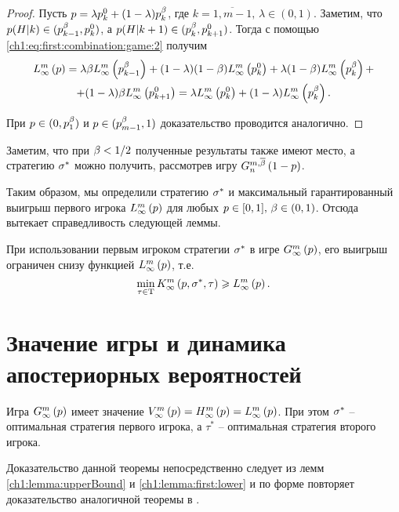 {\begin{proof}
  Пусть $p = \lambda\pEven + (1-\lambda)\pOdd$, где $k = \overline{1, m - 1}, \, \lambda \in (0, 1)$.
  Заметим, что $p(H|k) \in ( \pOdd[k-1], \pEven )$, а $p(H|k+1) \in ( \pOdd, \pEven[k+1] )$.
  Тогда с помощью \eqref{ch1:eq:first:combination:game:2} получим
  \begin{multline*}
    \lowerBound{p} =
    \lambda \Co \lowerBound{\pOdd[k-1]} + 
    (1-\lambda)(1-\Co)\lowerBound{\pEven} + \lambda(1-\Co)\lowerBound{\pOdd} + \\
    + (1-\lambda)\Co\lowerBound{\pEven[k+1]} 
    = \lambda \lowerBound{\pEven} + (1-\lambda) \lowerBound{\pOdd}.
  \end{multline*}
  
  При $p \in ( 0, \pOdd[1] )$ и $p \in ( \pOdd[m-1], 1 )$ доказательство проводится аналогично.
\end{proof}

Заметим, что при $\Co < 1/2$ полученные результаты также имеют место, а стратегию $\fOpt$ можно получить, рассмотрев игру $\symmGameExpression[n]{1-p}$.

Таким образом, мы определили стратегию $\fOpt$ и максимальный гарантированный выигрыш первого игрока $\lowerBound{p}$ для любых $p \in [0, 1], \, \Co \in (0, 1)$.
Отсюда вытекает справедливость следующей леммы.

\begin{lemma}
  \label{ch1:lemma:first:lower}
  При использовании первым игроком стратегии $\fOpt$ в игре $\infiniteGame{p}$\textup{,} его выигрыш ограничен снизу функцией $\lowerBound{p}$\textup{,} т.е.
  \[
    \min_{\tau \in \Tau} \infiniteFirstPlayerPayoff{p}{\fOpt}{\tau} \geq
    \lowerBound{p}.
  \]
\end{lemma}

\section{Значение игры и динамика апостериорных вероятностей}\label{ch1:game-value}

\begin{theorem}
  Игра $\infiniteGame{p}$ имеет значение $\infiniteGameValue{p} = \upperBound{p} = \lowerBound{p}$.
  При этом $\fOpt$ -- оптимальная стратегия первого игрока\textup{,} а $\tau^*$ -- оптимальная стратегия второго игрока.
\end{theorem}
Доказательство данной теоремы непосредственно следует из лемм \ref{ch1:lemma:upperBound} и \ref{ch1:lemma:first:lower} и по форме повторяет доказательство аналогичной теоремы в \cite{domansky07}.

}
